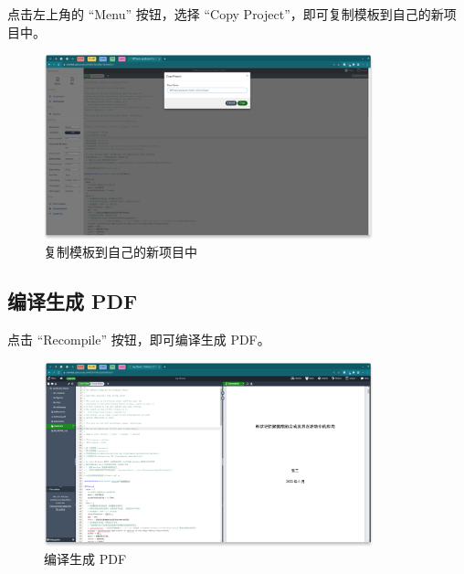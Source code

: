 点击左上角的 ``Menu'' 按钮，选择 ``Copy Project''，即可复制模板到自己的新项目中。

\begin{figure}[H]
  \begin{center}
    \includegraphics[width=0.85\textwidth]{imgs/overleaf-copy-project.png}
  \end{center}
  \caption{复制模板到自己的新项目中}
  \label{fig:overleaf-copy-project}
\end{figure}

\subsection{编译生成 PDF}

点击 ``Recompile'' 按钮，即可编译生成 PDF。

\begin{figure}[H]
  \begin{center}
    \includegraphics[width=0.85\textwidth]{imgs/overleaf-compile.png}
  \end{center}
  \caption{编译生成 PDF}
  \label{fig:overleaf-recompile}
\end{figure}

